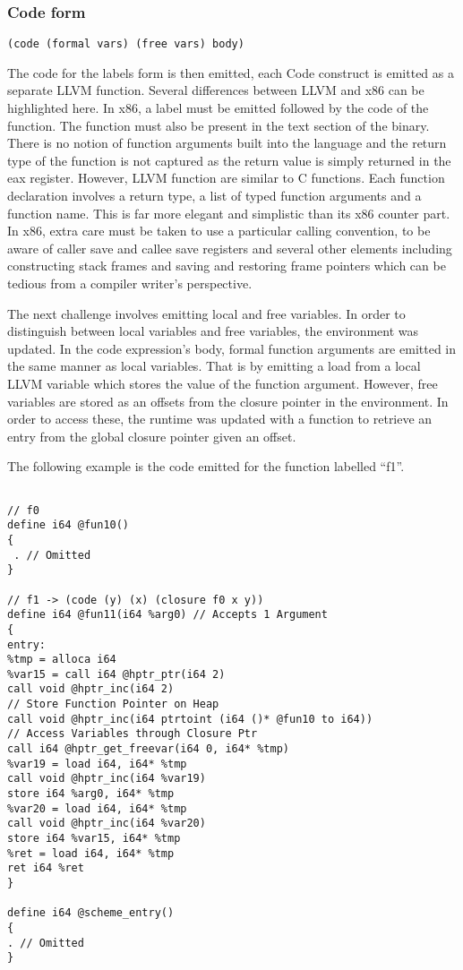 \documentclass{article}
\begin{document}

\subsubsection{Code form}

\begin{verbatim}
(code (formal vars) (free vars) body)
\end{verbatim}

The code for the labels form is then emitted, each Code construct is emitted as a separate LLVM function. Several differences between LLVM and x86 can be highlighted here. In x86, a label must be emitted followed by the code of the function. The function must also be present in the text section of the binary. There is no notion of function arguments built into the language and the return type of the function is not captured as the return value is simply returned in the eax register. However, LLVM function are similar to C functions. Each function declaration involves a return type, a list of typed function arguments and a function name. This is far more elegant and simplistic than its x86 counter part. In x86, extra care must be taken to use a particular calling convention, to be aware of caller save and callee save registers and several other elements including constructing stack frames and saving and restoring frame pointers which can be tedious from a compiler writer's perspective. 

The next challenge involves emitting local and free variables. In order to distinguish between local variables and free variables, the environment was updated. In the code expression's body, formal function arguments are emitted in the same manner as local variables. That is by emitting a load from a local LLVM variable which stores the value of the function argument. However, free variables are stored as an offsets from the closure pointer in the environment. In order to access these, the runtime was updated with a function to retrieve an entry from the global closure pointer given an offset.

The following example is the code emitted for the function labelled ``f1''. 

\begingroup
    \fontsize{8pt}{5pt}\selectfont
\begin{verbatim}

// f0
define i64 @fun10() 
{
 . // Omitted
}
 
// f1 -> (code (y) (x) (closure f0 x y)) 
define i64 @fun11(i64 %arg0) // Accepts 1 Argument
{
entry: 
%tmp = alloca i64
%var15 = call i64 @hptr_ptr(i64 2)
call void @hptr_inc(i64 2)
// Store Function Pointer on Heap
call void @hptr_inc(i64 ptrtoint (i64 ()* @fun10 to i64))
// Access Variables through Closure Ptr
call i64 @hptr_get_freevar(i64 0, i64* %tmp) 
%var19 = load i64, i64* %tmp
call void @hptr_inc(i64 %var19)
store i64 %arg0, i64* %tmp
%var20 = load i64, i64* %tmp
call void @hptr_inc(i64 %var20)
store i64 %var15, i64* %tmp
%ret = load i64, i64* %tmp
ret i64 %ret
}

define i64 @scheme_entry()
{
. // Omitted
}
\end{verbatim}
\endgroup
\end{document}
